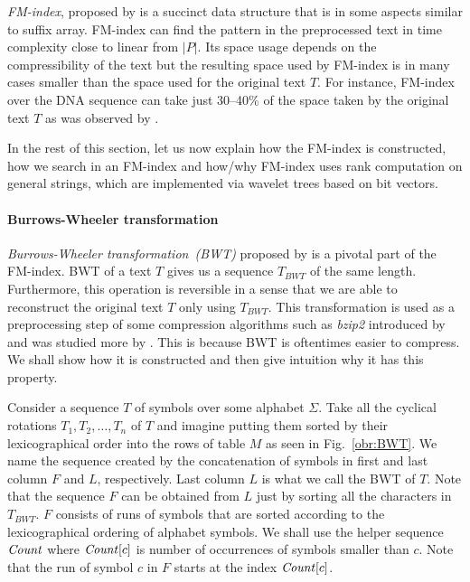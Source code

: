 \textit{FM-index}, proposed by \cite{ferragina2000opportunistic} is a succinct data structure that
is in some aspects similar to suffix array. FM-index can find the pattern in the preprocessed text
in time complexity close to linear from $|P|$. Its space usage depends on the compressibility of the text but the
resulting space used by FM-index is in many cases smaller than the space used for the original text $T$.
For instance, FM-index over the DNA sequence can take just 30--40\% of the space taken by the original text
$T$ as was observed by \cite{ferragina2001experimental}.

In the rest of this section, let us now explain how the FM-index is constructed, how we search in an
FM-index and how/why FM-index uses rank computation on general strings, which are implemented via
wavelet trees based on bit vectors.

\paragraph{Burrows-Wheeler transformation}

\textit{Burrows-Wheeler transformation~(BWT)} proposed by \cite{burrows1994block} is a pivotal
part of the FM-index. BWT of a text $T$ gives us a sequence $\mathit{T_{BWT}}$ of the same
length. Furthermore, this operation is reversible in a sense that we are able to reconstruct
the original text $T$ only using $\mathit{T_{BWT}}$. This transformation is used as a
preprocessing step of some compression algorithms such as \textit{bzip2} introduced by
\cite{seward1996bzip2} and was studied more by \cite{manzini2001analysis}. This is because
BWT is oftentimes easier to compress. We shall show how it is constructed and then give 
intuition why it has this property.

Consider a sequence $T$ of symbols over some
alphabet $\Sigma$. Take all the cyclical rotations $T_1, T_2, \ldots ,T_n$ of
$T$ and imagine putting them sorted by their lexicographical order into the
rows of table $M$ as seen in Fig.~\ref{obr:BWT}. We name the sequence created by the
concatenation of symbols in first and last column $F$ and $L$, respectively. Last column $L$
is what we call the BWT of $T$. Note that the sequence $F$ can be obtained from $L$ just by
sorting all the characters in $\mathit{T_{BWT}}$. $F$ consists of runs of symbols that are
sorted according to the lexicographical ordering of alphabet symbols. We shall use the helper
sequence $\mathit{Count}$ where $\mathit{Count}[c]$ is number of occurrences of symbols smaller than $c$.
Note that the run of symbol $c$ in $F$ starts at the index $\mathit{Count}[c]$.

